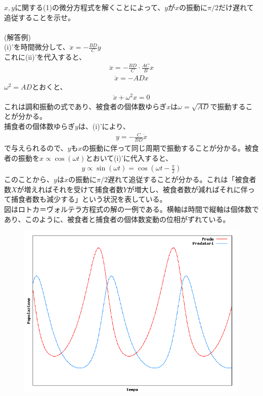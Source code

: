 \documentclass[a4paper,11pt,fleqn]{jarticle}
\begin{document}
\newpage
\subsubsection{}
$x,y$に関する(1)の微分方程式を解くことによって、$y$が$x$の振動に$\pi /2$だけ遅れて追従することを示せ。\\
\\
(解答例)\\
(i)'を時間微分して、$\ddot{x}=-\frac{BD}{C}\dot{y}$\\
これに(ii)'を代入すると、
\begin{eqnarray*}
\ddot{x}=-\frac{BD}{C}\cdot\frac{AC}{B}x
\end{eqnarray*}
\begin{eqnarray*}
\ddot{x}=-ADx
\end{eqnarray*}
${\omega}^2=AD$とおくと、
\begin{eqnarray*}
\ddot{x}+{\omega}^2x=0
\end{eqnarray*}
これは調和振動の式であり、被食者の個体数ゆらぎ$x$は$\omega =\sqrt{AD}$で振動することが分かる。\\
捕食者の個体数ゆらぎ$y$は、(i)'により、
\begin{eqnarray*}
y=-\frac{C}{BD}\dot{x}
\end{eqnarray*}
で与えられるので、$y$も$x$の振動に伴って同じ周期で振動することが分かる。被食者の振動を$x\propto\cos(\omega t)$とおいて(i)'に代入すると、
\begin{eqnarray*}
y\propto\sin(\omega t)=\cos\left(\omega t-\frac{\pi}{2}\right)
\end{eqnarray*}
このことから、$y$は$x$の振動に$\pi /2$遅れて追従することが分かる。これは「被食者数$X$が増えればそれを受けて捕食者数$Y$が増大し、被食者数が減ればそれに伴って捕食者数も減少する」という状況を表している。\\
図はロトカ＝ヴォルテラ方程式の解の一例である。横軸は時間で縦軸は個体数であり、このように、被食者と捕食者の個体数変動の位相がずれている。
\begin{figure}[htpb]
\begin{center}
\includegraphics[scale=.30]{Lotka-Volterra.png}
\end{center}
\end{figure}
\end{document}
